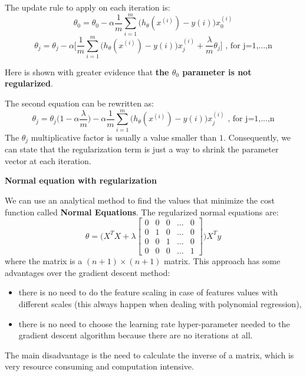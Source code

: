 \documentclass[11pt]{article}
\begin{document}
The update rule to apply on each iteration is:
\[\theta_0 = \theta_0 - \alpha \frac{1}{m}\sum_{i=1}^m\big(h_\theta(x^{(i)})-y{(i)}\big)x_{0}^{(i)} \]
\[\theta_j = \theta_j - \alpha \bigg[ \frac{1}{m}\sum_{i=1}^m\big(h_\theta(x^{(i)})-y{(i)}\big)x_{j}^{(i)}+\frac{\lambda}{m} \theta_j\bigg] \text{ , for j=1,...,n} \]

Here is shown with greater evidence that \textbf{the \(\theta_0\)
parameter is not regularized}.

The second equation can be rewritten as:
\[\theta_j = \theta_j \big( 1-\alpha \frac{ \lambda}{m} \big) - \alpha  \frac{1}{m}\sum_{i=1}^m\big(h_\theta(x^{(i)})-y{(i)}\big)x_{j}^{(i)} \text{ , for j=1,...,n} \]
The \(\theta_j\) multiplicative factor is usually a value smaller than \(1\). Consequently, we can state that the regularization term is just a way to shrink the parameter vector at each iteration. \\ 
\begin{center}
    \textbf{{\Large Normal equation with regularization}} 
\end{center}

We can use an analytical method to find the values that minimize the cost function called \textbf{Normal Equations}. The regularized normal equations are:
\[\theta = \Big( X^TX+\lambda \begin{bmatrix}
    0       & 0 & 0 & \dots & 0 \\
    0       & 1 & 0 & \dots & 0 \\
    0       & 0 & 1 & \dots & 0 \\
    0       & 0 & 0 & \dots & 1
\end{bmatrix} \Big)X^Ty\] where the matrix is a \((n+1)\times(n+1)\)
matrix. This approach has some advantages over the gradient descent
method:
\begin{itemize}
    \item there is no need to do the feature scaling in case of features
values with different scales (this always happen when dealing with
polynomial regression),
\item there is no need to choose the learning rate
hyper-parameter needed to the gradient descent algorithm because there
are no iterations at all.
\end{itemize}

The main disadvantage is the need to calculate the inverse of a matrix,
which is very resource consuming and computation intensive.
\end{document}
